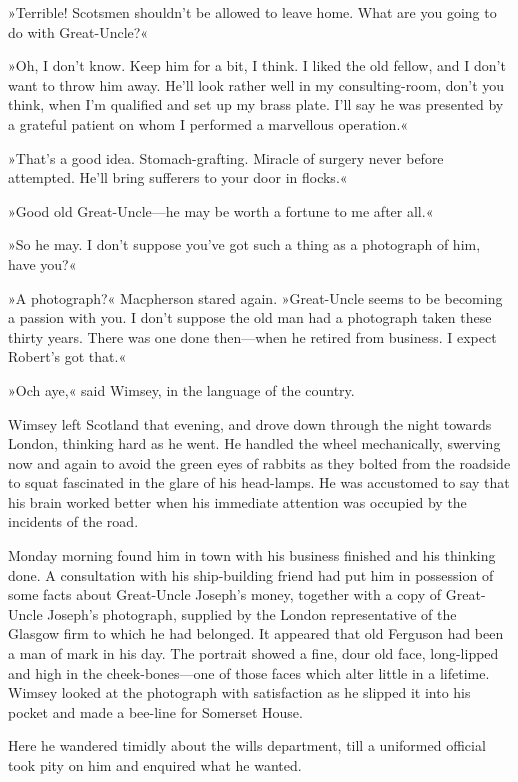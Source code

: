 »Terrible! Scotsmen shouldn't be allowed to leave home. What are you going to do with Great-Uncle?«

»Oh, I don't know. Keep him for a bit, I think. I liked the old fellow, and I don't want to throw him away. He'll look rather well in my consulting-room, don't you think, when I'm qualified and set up my brass plate. I'll say he was presented by a grateful patient on whom I performed a marvellous operation.«

»That's a good idea. Stomach-grafting. Miracle of surgery never before attempted. He'll bring sufferers to your door in flocks.«

»Good old Great-Uncle—he may be worth a fortune to me after all.«

»So he may. I don't suppose you've got such a thing as a photograph of him, have you?«

»A photograph?« Macpherson stared again. »Great-Uncle seems to be becoming a passion with you. I don't suppose the old man had a photograph taken these thirty years. There was one done then—when he retired from business. I expect Robert's got that.«

»Och aye,« said Wimsey, in the language of the country.

Wimsey left Scotland that evening, and drove down through the night towards London, thinking hard as he went. He handled the wheel mechanically, swerving now and again to avoid the green eyes of rabbits as they bolted from the roadside to squat fascinated in the glare of his head-lamps. He was accustomed to say that his brain worked better when his immediate attention was occupied by the incidents of the road.

Monday morning found him in town with his business finished and his thinking done. A consultation with his ship-building friend had put him in possession of some facts about Great-Uncle Joseph's money, together with a copy of Great-Uncle Joseph's photograph, supplied by the London representative of the Glasgow firm to which he had belonged. It appeared that old Ferguson had been a man of mark in his day. The portrait showed a fine, dour old face, long-lipped and high in the cheek-bones—one of those faces which alter little in a lifetime. Wimsey looked at the photograph with satisfaction as he slipped it into his pocket and made a bee-line for Somerset House.

Here he wandered timidly about the wills department, till a uniformed official took pity on him and enquired what he wanted.

